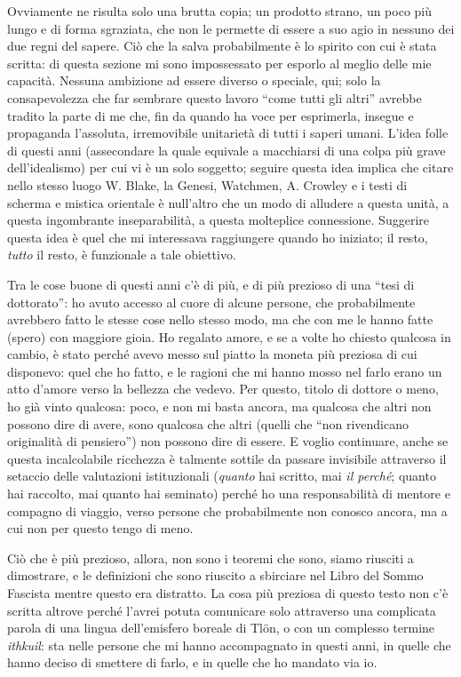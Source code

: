 Ovviamente ne risulta solo una brutta copia; un prodotto strano, un poco più lungo e di forma sgraziata, che non le permette di essere a suo agio in nessuno dei due regni del sapere. Ciò che la salva probabilmente è lo spirito con cui è stata scritta: di questa sezione mi sono impossessato per esporlo al meglio delle mie capacità. Nessuna ambizione ad essere diverso o speciale, qui; solo la consapevolezza che far sembrare questo lavoro ``come tutti gli altri'' avrebbe tradito la parte di me che, fin da quando ha voce per esprimerla, insegue e propaganda l'assoluta, irremovibile unitarietà di tutti i saperi umani. L'idea folle di questi anni (assecondare la quale equivale a macchiarsi di una colpa più grave dell'idealismo) per cui vi è un solo soggetto; seguire questa idea implica che citare nello stesso luogo W\@. Blake, la Genesi, Watchmen, A\@. Crowley e i testi di scherma e mistica orientale è null'altro che un modo di alludere a questa unità, a questa ingombrante inseparabilità, a questa molteplice connessione. Suggerire questa idea è quel che mi interessava raggiungere quando ho iniziato; il resto, \emph{tutto} il resto, è funzionale a tale obiettivo.

Tra le cose buone di questi anni c'è di più, e di più prezioso di una ``tesi di dottorato'': ho avuto accesso al cuore di alcune persone, che probabilmente avrebbero fatto le stesse cose nello stesso modo, ma che con me le hanno fatte (spero) con maggiore gioia. Ho regalato amore, e se a volte ho chiesto qualcosa in cambio, è stato perché avevo messo sul piatto la moneta più preziosa di cui disponevo: quel che ho fatto, e le ragioni che mi hanno mosso nel farlo erano un atto d'amore verso la bellezza che vedevo. Per questo, titolo di dottore o meno, ho già vinto qualcosa: poco, e non mi basta ancora, ma qualcosa che altri non possono dire di avere, sono qualcosa che altri (quelli che ``non rivendicano originalità di pensiero'') non possono dire di essere. E voglio continuare, anche se questa incalcolabile ricchezza è talmente sottile da passare invisibile attraverso il setaccio delle valutazioni istituzionali (\emph{quanto} hai scritto, mai \emph{il perché}; quanto hai raccolto, mai quanto hai seminato) perché ho una responsabilità di mentore e compagno di viaggio, verso persone che probabilmente non conosco ancora, ma a cui non per questo tengo di meno.

Ciò che è più prezioso, allora, non sono i teoremi che sono, siamo riusciti a dimostrare, e le definizioni che sono riuscito a sbirciare nel Libro del Sommo Fascista mentre questo era distratto. La cosa più preziosa di questo testo non c'è scritta altrove perché l'avrei potuta comunicare solo attraverso una complicata parola di una lingua dell'emisfero boreale di Tl\"on, o con un complesso termine \emph{ithkuil}: sta nelle persone che mi hanno accompagnato in questi anni, in quelle che hanno deciso di smettere di farlo, e in quelle che ho mandato via io.

